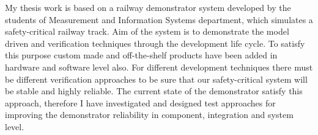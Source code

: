My thesis work is based on a railway demonstrator system developed by the students of Measurement and Information Systems department, which simulates a safety-critical railway track. Aim of the system is to demonstrate the model driven and verification techniques through the development life cycle. To satisfy this purpose custom made and off-the-shelf products have been added in hardware and software level also. For different development techniques there must be different verification approaches to be sure that our safety-critical system will be stable and highly reliable. The current state of the demonstrator satisfy this approach, therefore I have investigated and designed test approaches for improving the demonstrator reliability in component, integration and system level.


\vfill
\selectthesislanguage

\setcounter{romanPage}{\value{page}}
